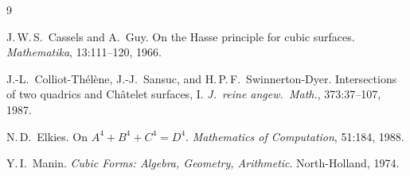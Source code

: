 \documentclass[12pt, a4paper]{article}
\theoremstyle{definition}
\begin{document}

\begin{thebibliography}{9}

J.\,W.\,S.~Cassels and A.~Guy.
\newblock On the Hasse principle for cubic surfaces.
\newblock \textit{Mathematika}, 13:111--120, 1966.

J.-L.~Colliot-Thélène, J.-J.~Sansuc, and H.\,P.\,F.~Swinnerton-Dyer.
\newblock Intersections of two quadrics and Châtelet surfaces, I.
\newblock \textit{J.\ reine angew.\ Math.}, 373:37--107, 1987.

N.\,D.~Elkies.
\newblock On $A^4 + B^4 + C^4 = D^4$.
\newblock \textit{Mathematics of Computation}, 51:184, 1988.

Y.\,I.~Manin.
\newblock \textit{Cubic Forms: Algebra, Geometry, Arithmetic}.
\newblock North-Holland, 1974.

\end{thebibliography}
\end{document}
